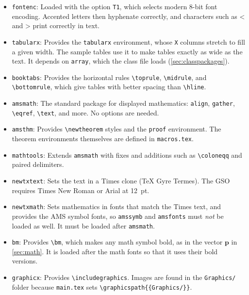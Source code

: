 \begin{itemize}
\item \texttt{fontenc}: Loaded with the option \texttt{T1}, which selects modern 8-bit font encoding. Accented letters then hyphenate correctly, and characters such as < and > print correctly in text.

\item \texttt{tabularx}: Provides the \texttt{tabularx} environment, whose \texttt{X} columns stretch to fill a given width. The sample tables use it to make tables exactly as wide as the text. It depends on \texttt{array}, which the class file loads (\cref{sec:classpackages}).

\item \texttt{booktabs}: Provides the horizontal rules \verb+\toprule+, \verb+\midrule+, and \verb+\bottomrule+, which give tables with better spacing than \verb+\hline+.

\item \texttt{amsmath}: The standard package for displayed mathematics: \texttt{align}, \texttt{gather}, \verb+\eqref+, \verb+\text+, and more. No options are needed.

\item \texttt{amsthm}: Provides \verb+\newtheorem+ styles and the \texttt{proof} environment. The theorem environments themselves are defined in \texttt{macros.tex}.

\item \texttt{mathtools}: Extends \texttt{amsmath} with fixes and additions such as \verb+\coloneqq+ and paired delimiters.

\item \texttt{newtxtext}: Sets the text in a Times clone (TeX Gyre Termes). The GSO requires Times New Roman or Arial at 12~pt.

\item \texttt{newtxmath}: Sets mathematics in fonts that match the Times text, and provides the AMS symbol fonts, so \texttt{amssymb} and \texttt{amsfonts} must \emph{not} be loaded as well. It must be loaded after \texttt{amsmath}.

\item \texttt{bm}: Provides \verb+\bm+, which makes any math symbol bold, as in the vector $\bm{p}$ in \cref{sec:math}. It is loaded after the math fonts so that it uses their bold versions.

\item \texttt{graphicx}: Provides \verb+\includegraphics+. Images are found in the \texttt{Graphics/} folder because \texttt{main.tex} sets \verb+\graphicspath{{Graphics/}}+.


\end{itemize}
